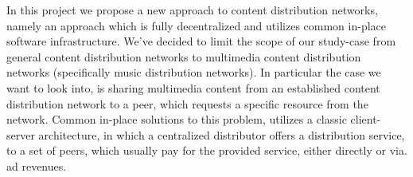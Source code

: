 In this project we propose a new approach to content distribution networks,
namely an approach which is fully decentralized and utilizes common in-place 
software infrastructure.
\newline\newline
We've decided to limit the scope of our study-case from general content
distribution networks to multimedia content distribution networks
(specifically music distribution networks).
\newline
In particular the case we want to look into, is sharing multimedia content from
an established content distribution network to a peer, which requests a
specific resource from the network.
\newline\newline
Common in-place solutions to this problem, utilizes a classic client-server
architecture, in which a centralized distributor offers a distribution service,
to a set of peers, which usually pay for the provided service, either directly
or via. ad revenues.

